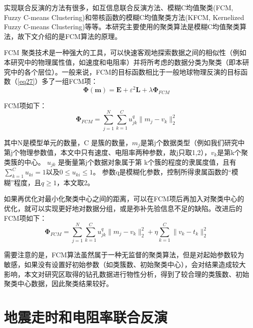 实现联合反演的方法有很多，如互信息联合反演方法、模糊C均值聚类(FCM, Fuzzy C-means Clustering)和带核函数的模糊C均值聚类方法(KFCM, Kernelized Fuzzy C-means Clustering)等等。本研究主要使用的聚类算法是模糊C均值聚类算法，故下文介绍的是FCM算法的原理。

FCM 聚类技术是一种强大的工具，可以快速客观地探索数据之间的相似性（例如本研究中的物理属性值，如速度和电阻率）并将所考虑的数据分类为聚类（即本研究中的各个层位）。一般来说，FCM的目标函数相比于一般地球物理反演的目标函数（\ref{eq27}）多了一组FCM项：
\begin{equation}
    \mathbf{\Phi}(\mathbf{m})=\mathbf{E}+\varepsilon^2\mathbf{L}+\lambda\mathbf{\Phi}_{FCM}
    \label{fcmformula}
\end{equation}

FCM项如下：
\begin{equation}
    \mathbf{\Phi}_{FCM}=\sum_{j=1}^{N}\sum_{k=1}^Cu_{jk}^q\|m_j-v_k\|_2^2
    \label{fcmcondition}
\end{equation}

其中N是模型单元的数量，C 是簇的数量，$m_j$是第j个数据类型（例如我们研究中第j个物理参数值，本文中只有速度、电阻率两种参数，故j只取1,2），$v_k$是第k个聚类簇的中心。 $u_{jk}$ 是衡量第j个数据对象属于第 k个簇的程度的隶属度值，且有$\sum_{k=1}^Cu_{ki}=1$以及$0\le u_{ki}\le1$。 参数q是模糊化参数，控制所得隶属函数的“模糊”程度，且$q\ge1$，本文取2。

如果再优化对最小化聚类中心之间的距离，可以在FCM项后再加入对聚类中心的优化，就可以实现更好地对数据分组，或是弥补先验信息不足的缺陷。改进后的FCM项如下：
\begin{equation}
    \mathbf{\Phi}_{FCM}=\sum_{j=1}^{N}\sum_{k=1}^Cu_{jk}^q\|m_j-v_k\|_2^2+\eta\sum_{k=1}^C\|v_k-t_k\|_2^2
    \label{fcmcondition2}
\end{equation}

需要注意的是，FCM算法虽然属于一种无监督的聚类算法，但是对起始参数较为敏感，如果没有设置好初始参数（如类簇数、初始聚类中心），会对结果造成较大影响，本文对研究区取得的钻孔数据进行物性分析，得到了较合理的类簇数、初始聚类中心数据，因此聚类结果较好。

\newpage
\section{地震走时和电阻率联合反演}